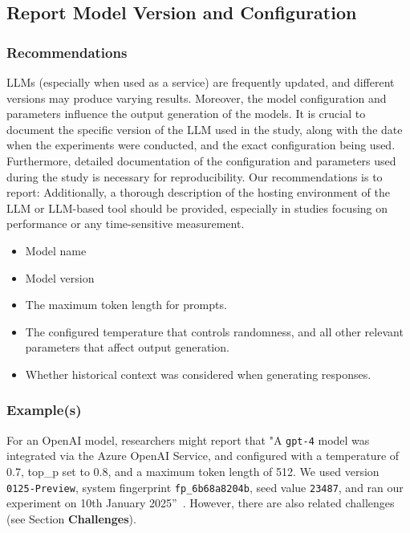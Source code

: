 \documentclass[11pt]{article}
\begin{document}
\subsection{Report Model Version and Configuration}

\subsubsection{Recommendations}

LLMs (especially when used as a service) are frequently updated, and different versions may produce varying results.
Moreover, the model configuration and parameters influence the output generation of the models.
It is crucial to document the specific version of the LLM used in the study, along with the date when the experiments were conducted, and the exact configuration being used.
Furthermore, detailed documentation of the configuration and parameters used during the study is necessary for reproducibility. 
Our recommendations is to report:
Additionally, a thorough description of the hosting environment of the LLM or LLM-based tool should be provided, especially in studies focusing on performance or any time-sensitive measurement.

\begin{itemize}
\item Model name
\item Model version
\item The maximum token length for prompts.
\item The configured temperature that controls randomness, and all other relevant parameters that affect output generation.
\item Whether historical context was considered when generating responses.
\end{itemize}


\subsubsection{Example(s)}

For an OpenAI model, researchers might report that "A  \texttt{gpt-4} model was integrated via the Azure OpenAI Service, and configured with a temperature of 0.7, top\_p set to 0.8, and a maximum token length of 512. We used version \texttt{0125-Preview}, system fingerprint \texttt{fp\_6b68a8204b}, seed value \texttt{23487}, and ran our experiment on 10th January 2025''~\cite{OpenAI25, Azure25}.
However, there are also related challenges (see Section \textbf{Challenges}).
\end{document}
